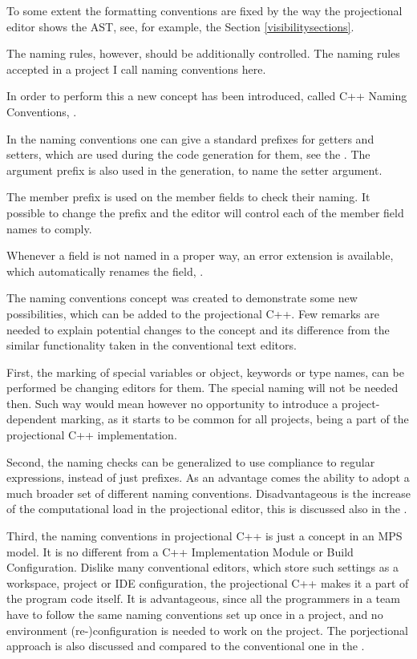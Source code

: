 To some extent the formatting conventions are fixed
by the way the projectional editor shows the AST, see, for example, the Section \ref{visibilitysections}.

The naming rules, however, should be additionally controlled. The naming rules accepted in a project I call 
naming conventions here.

In order to perform this a new concept has been introduced, called C++ Naming Conventions, .


In the naming conventions one can give a standard prefixes for getters and setters, which are used during the code 
generation for them, see the . The argument prefix is also used in the generation, to name the
setter argument.

The member prefix is used on the member fields to check their naming. It possible to change the prefix and the editor will control
each of the member field names to comply.

Whenever a field is not named in a proper way, an error extension is available, which automatically renames the field, .


The naming conventions concept was created to demonstrate some new possibilities, which can be added to the projectional C++.
Few remarks are needed to explain potential changes to the concept and its difference from the similar functionality taken
in the conventional text editors.

First, the marking of special variables or object, keywords or type names, can be performed be changing editors for them. The special
naming will not be needed then. Such way would mean however no opportunity to introduce a project-dependent marking, as it starts to be
common for all projects, being a part of the projectional C++ implementation.

Second, the naming checks can be generalized to use compliance to regular expressions, instead of just prefixes. As an advantage comes the
ability to adopt a much broader set of different naming conventions. Disadvantageous is the increase
of the computational load in the projectional editor, this is discussed also in the .

Third, the naming conventions in projectional C++ is just a concept in an MPS model. It is no different from a C++ Implementation Module
or Build Configuration. Dislike many conventional editors, which store such settings as a workspace, project or IDE configuration, the
projectional C++ makes it a part of the program code itself. It is advantageous, since all the programmers in a team have to follow the 
same naming conventions set up once in a project, and no environment (re-)configuration is needed to work on the project. The porjectional
approach is also discussed and compared to the conventional one in the .

